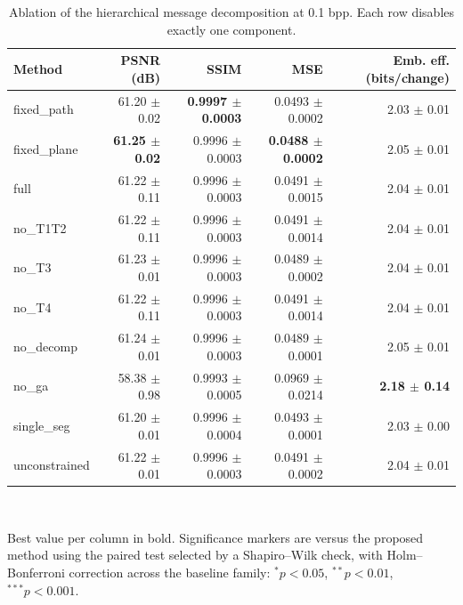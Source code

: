 \begin{table}[!t]
\centering
\caption{Ablation of the hierarchical message decomposition at 0.1 bpp. Each row disables exactly one component.}
\label{tab:ablation}
\footnotesize
\begin{tabular}{lrrrr}
\toprule
Method & PSNR (dB) & SSIM & MSE & Emb. eff. (bits/change) \\
\midrule
fixed\_path & 61.20 $\pm$ 0.02 & \textbf{0.9997 $\pm$ 0.0003} & 0.0493 $\pm$ 0.0002 & 2.03 $\pm$ 0.01 \\
fixed\_plane & \textbf{61.25 $\pm$ 0.02} & 0.9996 $\pm$ 0.0003 & \textbf{0.0488 $\pm$ 0.0002} & 2.05 $\pm$ 0.01 \\
full & 61.22 $\pm$ 0.11 & 0.9996 $\pm$ 0.0003 & 0.0491 $\pm$ 0.0015 & 2.04 $\pm$ 0.01 \\
no\_T1T2 & 61.22 $\pm$ 0.11 & 0.9996 $\pm$ 0.0003 & 0.0491 $\pm$ 0.0014 & 2.04 $\pm$ 0.01 \\
no\_T3 & 61.23 $\pm$ 0.01 & 0.9996 $\pm$ 0.0003 & 0.0489 $\pm$ 0.0002 & 2.04 $\pm$ 0.01 \\
no\_T4 & 61.22 $\pm$ 0.11 & 0.9996 $\pm$ 0.0003 & 0.0491 $\pm$ 0.0014 & 2.04 $\pm$ 0.01 \\
no\_decomp & 61.24 $\pm$ 0.01 & 0.9996 $\pm$ 0.0003 & 0.0489 $\pm$ 0.0001 & 2.05 $\pm$ 0.01 \\
no\_ga & 58.38 $\pm$ 0.98 & 0.9993 $\pm$ 0.0005 & 0.0969 $\pm$ 0.0214 & \textbf{2.18 $\pm$ 0.14} \\
single\_seg & 61.20 $\pm$ 0.01 & 0.9996 $\pm$ 0.0004 & 0.0493 $\pm$ 0.0001 & 2.03 $\pm$ 0.00 \\
unconstrained & 61.22 $\pm$ 0.01 & 0.9996 $\pm$ 0.0003 & 0.0491 $\pm$ 0.0002 & 2.04 $\pm$ 0.01 \\
\bottomrule
\end{tabular}
\\[2pt] \parbox{\linewidth}{\scriptsize Best value per column in bold. Significance markers are versus the proposed method using the paired test selected by a Shapiro--Wilk check, with Holm--Bonferroni correction across the baseline family: $^{*}p<0.05$, $^{**}p<0.01$, $^{***}p<0.001$.}
\end{table}
